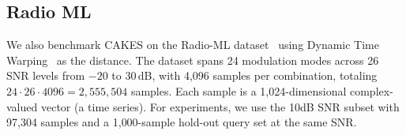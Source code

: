\subsection{Radio ML}
\label{sec:datasets-and-benchmarks:radio-ml}

We also benchmark CAKES on the Radio-ML dataset~\cite{oshea2018radioml} using Dynamic Time Warping~\cite{muller2007dynamic} as the distance. The dataset spans 24 modulation modes across 26 SNR levels from $-20$ to $30$\,dB, with 4{,}096 samples per combination, totaling $24\!\cdot\!26\!\cdot\!4096=2{,}555{,}504$ samples. Each sample is a 1{,}024-dimensional complex-valued vector (a time series). For experiments, we use the 10dB SNR subset with 97{,}304 samples and a 1{,}000-sample hold-out query set at the same SNR.









